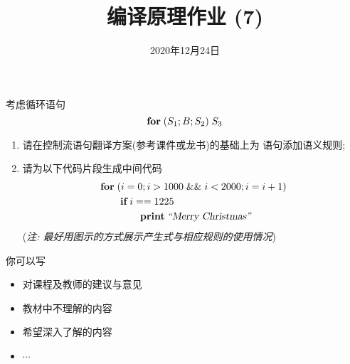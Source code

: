 \documentclass[a4paper, justified]{tufte-handout}
\title{编译原理作业 (7)}
\date{2020年12月24日}
\begin{document}
\maketitle
\noplagiarism %
\begin{abstract}
\end{abstract}
\beginrequired

\begin{problem}[\score{10 = 5 + 5}]
  考虑循环语句
  \[
    \text{\bf for} \;(S_{1}; B; S_{2})\; S_{3}
  \]
  \begin{enumerate}[(1)]
    \item 请在控制流语句翻译方案(参考课件或龙书)的基础上为 \forkw{} 语句添加语义规则;
    \item 请为以下代码片段生成中间代码
      \begin{align*}
        &\text{\bf for}\; (i = 0; i > 1000 \;\&\&\; i < 2000; i = i + 1) \\
          &\qquad \text{\bf if}\; i == 1225\; \\
          &\qquad\qquad \text{\bf print}\; {\textsl{``Merry Christmas''}}
      \end{align*}
      ({\it 注: 最好用图示的方式展示产生式与相应规则的使用情况})
  \end{enumerate}
\end{problem}

\begin{solution}
\end{solution}



\beginfb

你可以写
\begin{itemize}
  \item 对课程及教师的建议与意见
  \item 教材中不理解的内容
  \item 希望深入了解的内容
  \item $\cdots$
\end{itemize}
\end{document}
